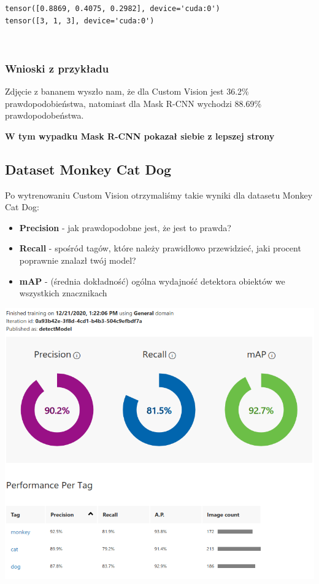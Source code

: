 \documentclass[11pt]{article}
\begin{document}
    \begin{Verbatim}[commandchars=\\\{\}]
tensor([0.8869, 0.4075, 0.2982], device='cuda:0')
tensor([3, 1, 3], device='cuda:0')
    \end{Verbatim}

    \begin{center}
    \end{center}
    { \hspace*{\fill} \\}
    
    \hypertarget{wnioski-z-przykux142adu}{%
\subsubsection{Wnioski z przykładu}\label{wnioski-z-przykux142adu}}

Zdjęcie z bananem wyszło nam, że dla Custom Vision jest 36.2\%
prawdopodobieństwa, natomiast dla Mask R-CNN wychodzi 88.69\%
prawdopodobeństwa.

\textbf{W tym wypadku Mask R-CNN pokazał siebie z lepszej strony}

    \hypertarget{dataset-monkey-cat-dog}{%
\subsection{Dataset Monkey Cat Dog}\label{dataset-monkey-cat-dog}}

Po wytrenowaniu Custom Vision otrzymaliśmy takie wyniki dla datasetu
Monkey Cat Dog: 
\begin{itemize}
    \item \textbf{Precision} - jak prawdopodobne jest, że jest to
prawda?
\item \textbf{Recall} - spośród tagów, które należy prawidłowo
przewidzieć, jaki procent poprawnie znalazł twój model?
\item \textbf{mAP} -
(średnia dokładność) ogólna wydajność detektora obiektów we wszystkich
znacznikach
\end{itemize}
\includegraphics{image_report/custom_monkey.png}
\end{document}

